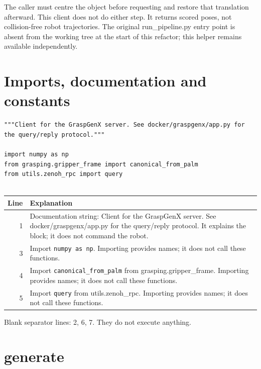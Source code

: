 \documentclass[11pt,a4paper]{book}
\begin{document}
The caller must centre the object before requesting and restore that translation afterward. This client does not do either step. It returns scored poses, not collision-free robot trajectories. The original run\_pipeline.py entry point is absent from the working tree at the start of this refactor; this helper remains available independently.

\section{Imports, documentation and constants}

\begin{lstlisting}[firstnumber=1]
"""Client for the GraspGenX server. See docker/graspgenx/app.py for the query/reply protocol."""

import numpy as np
from grasping.gripper_frame import canonical_from_palm
from utils.zenoh_rpc import query


\end{lstlisting}

\begin{longtable}{r p{}}

\textbf{Line} & \textbf{Explanation} \\ \hline \endhead

1 & Documentation string: Client for the GraspGenX server. See docker/graspgenx/app.py for the query/reply protocol. It explains the block; it does not command the robot. \\

3 & Import \texttt{numpy as np}. Importing provides names; it does not call these functions. \\

4 & Import \texttt{canonical\_from\_palm} from grasping.gripper\_frame. Importing provides names; it does not call these functions. \\

5 & Import \texttt{query} from utils.zenoh\_rpc. Importing provides names; it does not call these functions. \\

\end{longtable}

Blank separator lines: 2, 6, 7. They do not execute anything.

\section{generate}
\end{document}
